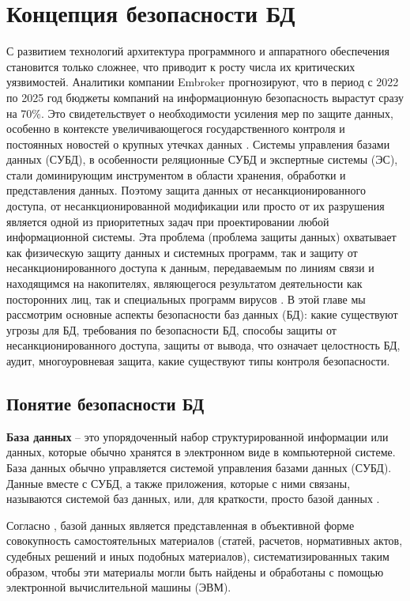 \section{Концепция безопасности БД}
С развитием технологий архитектура программного и аппаратного обеспечения становится только сложнее, что приводит к росту числа их критических уязвимостей. Аналитики компании Embroker прогнозируют, что в период с 2022 по 2025 год бюджеты компаний на информационную безопасность вырастут сразу на 70\%. Это свидетельствует о необходимости усиления мер по защите данных, особенно в контексте увеличивающегося государственного контроля и постоянных новостей о крупных утечках данных \autocite{DataProtectionMaterials}.
Системы управления базами данных (СУБД), в особенности реляционные СУБД и экспертные системы (ЭС), стали доминирующим инструментом в области хранения, обработки и представления данных. Поэтому защита данных от несанкционированного доступа, от несанкционированной модификации или просто от их разрушения является одной из приоритетных задач при проектировании любой информационной системы. Эта проблема (проблема защиты данных) охватывает как физическую защиту данных и системных программ, так и защиту от несанкционированного доступа к данным, передаваемым по линиям связи и находящимся на накопителях, являющегося результатом деятельности как посторонних лиц, так и специальных программ вирусов \autocite[с. 6]{Skakun}.
В этой главе мы рассмотрим основные аспекты безопасности баз данных (БД): какие существуют угрозы для БД, требования по безопасности БД, способы защиты от несанкционированного доступа, защиты от вывода, что означает целостность БД, аудит, многоуровневая защита, какие существуют типы контроля безопасности.

\subsection{Понятие безопасности БД}

\begin{grayquote}
	\textbf{База данных} -- это упорядоченный набор структурированной информации или данных, которые обычно хранятся в электронном виде в компьютерной системе. База данных обычно управляется системой управления базами данных (СУБД). Данные вместе с СУБД, а также приложения, которые с ними связаны, называются системой баз данных, или, для краткости, просто базой данных \autocite{oracleWhatIsDatabase}.
\end{grayquote}


\begin{grayquote}
	Согласно \autocite{CCRFPart4}, базой данных является представленная в объективной форме совокупность самостоятельных материалов (статей, расчетов, нормативных актов, судебных решений и иных подобных материалов), систематизированных таким образом, чтобы эти материалы могли быть найдены и обработаны с помощью электронной вычислительной машины (ЭВМ).
\end{grayquote}

